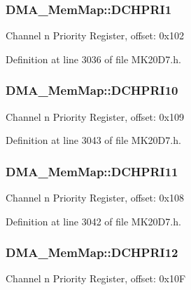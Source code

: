 \subsubsection[{\texorpdfstring{D\+C\+H\+P\+R\+I1}{DCHPRI1}}]{ D\+M\+A\+\_\+\+Mem\+Map\+::\+D\+C\+H\+P\+R\+I1}\hypertarget{struct_d_m_a___mem_map_a48487302ccd8b48c11c7781bbc65ed2a}{}\label{struct_d_m_a___mem_map_a48487302ccd8b48c11c7781bbc65ed2a}
Channel n Priority Register, offset\+: 0x102 

Definition at line 3036 of file M\+K20\+D7.\+h.

\subsubsection[{\texorpdfstring{D\+C\+H\+P\+R\+I10}{DCHPRI10}}]{ D\+M\+A\+\_\+\+Mem\+Map\+::\+D\+C\+H\+P\+R\+I10}\hypertarget{struct_d_m_a___mem_map_af2d688b08eb6137ca530abf7b28ad8d3}{}\label{struct_d_m_a___mem_map_af2d688b08eb6137ca530abf7b28ad8d3}
Channel n Priority Register, offset\+: 0x109 

Definition at line 3043 of file M\+K20\+D7.\+h.

\subsubsection[{\texorpdfstring{D\+C\+H\+P\+R\+I11}{DCHPRI11}}]{ D\+M\+A\+\_\+\+Mem\+Map\+::\+D\+C\+H\+P\+R\+I11}\hypertarget{struct_d_m_a___mem_map_ac88e35951301365fcf3ca39e3f75e018}{}\label{struct_d_m_a___mem_map_ac88e35951301365fcf3ca39e3f75e018}
Channel n Priority Register, offset\+: 0x108 

Definition at line 3042 of file M\+K20\+D7.\+h.

\subsubsection[{\texorpdfstring{D\+C\+H\+P\+R\+I12}{DCHPRI12}}]{ D\+M\+A\+\_\+\+Mem\+Map\+::\+D\+C\+H\+P\+R\+I12}\hypertarget{struct_d_m_a___mem_map_a5dd1dc0a32b487c3c6aae50e585fa322}{}\label{struct_d_m_a___mem_map_a5dd1dc0a32b487c3c6aae50e585fa322}
Channel n Priority Register, offset\+: 0x10F 

